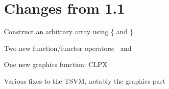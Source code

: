 \chapter{Changes from 1.1}

\begin{itemlist}
\item Construct an arbitrary array using \{ and \}
\item Two new function/functor operators: \basicseqapp\ and \basicinfixmap
\item One new graphics function: CLPX
\item Various fixes to the TSVM, notably the graphics part
\end{itemlist}
